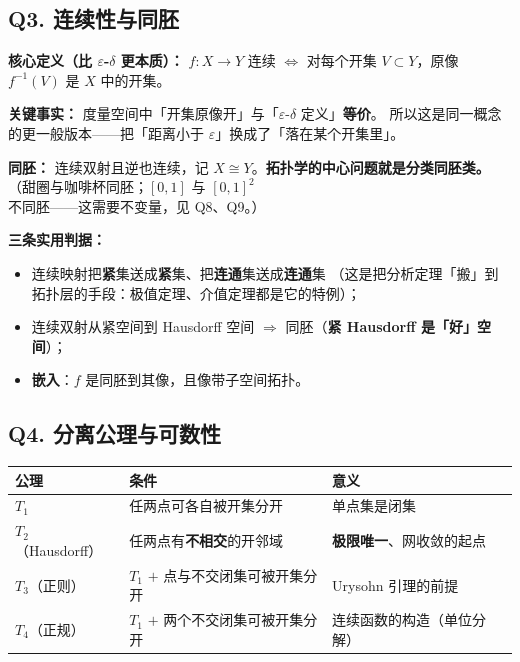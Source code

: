 \subsection{Q3. 连续性与同胚}

\textbf{核心定义（比 $\varepsilon$-$\delta$ 更本质）：} $f:X\to Y$ 连续 $\iff$
对每个开集 $V\subset Y$，原像 $f^{-1}(V)$ 是 $X$ 中的开集。

\textbf{关键事实：} 度量空间中「开集原像开」与「$\varepsilon$-$\delta$ 定义」\textbf{等价}。
所以这是同一概念的更一般版本——把「距离小于 $\varepsilon$」换成了「落在某个开集里」。

\textbf{同胚：} 连续双射且逆也连续，记 $X\cong Y$。\textbf{拓扑学的中心问题就是分类同胚类。}
（甜圈与咖啡杯同胚；$[0,1]$ 与 $[0,1]^2$ 不同胚——这需要不变量，见 Q8、Q9。）

\textbf{三条实用判据：}
\begin{itemize}
  \item 连续映射把\textbf{紧}集送成\textbf{紧}集、把\textbf{连通}集送成\textbf{连通}集
        （这是把分析定理「搬」到拓扑层的手段：极值定理、介值定理都是它的特例）；
  \item 连续双射从紧空间到 Hausdorff 空间 $\Longrightarrow$ 同胚（\textbf{紧 Hausdorff 是「好」空间}）；
  \item \textbf{嵌入}：$f$ 是同胚到其像，且像带子空间拓扑。
\end{itemize}

\subsection{Q4. 分离公理与可数性}

\begin{center}
\begin{tabular}{L{1.5cm}L{8.2cm}L{5.0cm}}
\toprule
\textbf{公理} & \textbf{条件} & \textbf{意义} \\
\midrule
$T_1$ & 任两点可各自被开集分开 & 单点集是闭集 \\
$T_2$（Hausdorff） & 任两点有\textbf{不相交}的开邻域 & \textbf{极限唯一}、网收敛的起点 \\
$T_3$（正则） & $T_1$ $+$ 点与不交闭集可被开集分开 & Urysohn 引理的前提 \\
$T_4$（正规） & $T_1$ $+$ 两个不交闭集可被开集分开 & 连续函数的构造（单位分解） \\
\bottomrule
\end{tabular}
\end{center}

